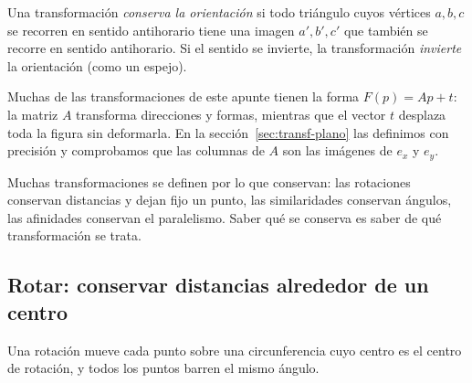 \begin{center}
\end{center}

\begin{definicion}[Orientación]
Una transformación \emph{conserva la orientación} si todo triángulo cuyos vértices
\(a,b,c\) se recorren en sentido antihorario tiene una imagen \(a',b',c'\) que también se
recorre en sentido antihorario. Si el sentido se invierte, la transformación \emph{invierte}
la orientación (como un espejo).
\end{definicion}

Muchas de las transformaciones de este apunte tienen la forma \(F(p)=Ap+t\): la matriz \(A\)
transforma direcciones y formas, mientras que el vector \(t\) desplaza toda la figura sin
deformarla. En la sección~\ref{sec:transf-plano} las definimos con precisión y comprobamos que
las columnas de \(A\) son las imágenes de \(e_x\) y \(e_y\).

\begin{idea}[Idea]
Muchas transformaciones se definen por lo que conservan: las rotaciones conservan distancias
y dejan fijo un punto, las similaridades conservan ángulos, las afinidades conservan el
paralelismo. Saber qué se conserva es saber de qué transformación se trata.
\end{idea}

\subsection{Rotar: conservar distancias alrededor de un centro}\label{sec:rotar}

{\small\vspace{1mm}\par}


Una rotación mueve cada punto sobre una circunferencia cuyo centro es el centro de rotación,
y todos los puntos barren el mismo ángulo.

